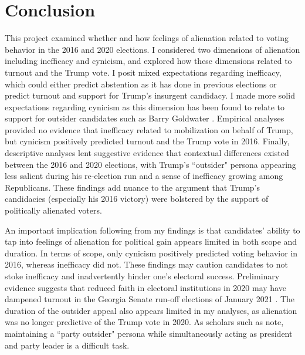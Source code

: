 \documentclass[12pt]{article}
\begin{document}
\section*{Conclusion}\label{sec:conclusion}
This project examined whether and how feelings of alienation related to voting behavior in the 2016 and 2020 elections. I considered two dimensions of alienation including inefficacy and cynicism, and explored how these dimensions related to turnout and the Trump vote. I posit mixed expectations regarding inefficacy, which could either predict abstention as it has done in previous elections or predict turnout and support for Trump's insurgent candidacy. I made more solid expectations regarding cynicism as this dimension has been found to relate to support for outsider candidates such as Barry Goldwater \parencite{aberbach1969alienation}. Empirical analyses provided no evidence that inefficacy related to mobilization on behalf of Trump, but cynicism positively predicted turnout and the Trump vote in 2016. Finally, descriptive analyses lent suggestive evidence that contextual differences existed between the 2016 and 2020 elections, with Trump's ``outsider" persona appearing less salient during his re-election run and a sense of inefficacy growing among Republicans. These findings add nuance to the argument that Trump's candidacies (especially his 2016 victory) were bolstered by the support of politically alienated voters.

An important implication following from my findings is that candidates' ability to tap into feelings of alienation for political gain appears limited in both scope and duration. In terms of scope, only cynicism positively predicted voting behavior in 2016, whereas inefficacy did not. These findings may caution candidates to not stoke inefficacy and inadvertently hinder one's electoral success. Preliminary evidence suggests that reduced faith in electoral institutions in 2020 may have dampened turnout in the Georgia Senate run-off elections of January 2021 \parencite{green2020online}. The duration of the outsider appeal also appears limited in my analyses, as alienation was no longer predictive of the Trump vote in 2020. As scholars such as \textcite{jungherr2019digital} note, maintaining a ``party outsider" persona while simultaneously acting as president and party leader is a difficult task. 
\end{document}
